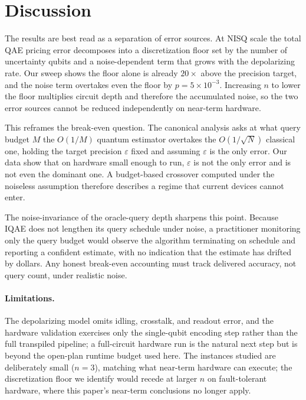 \documentclass[runningheads]{llncs}
\begin{document}
\section{Discussion}
The results are best read as a separation of error sources. At NISQ scale the
total QAE pricing error decomposes into a discretization floor set by the number
of uncertainty qubits and a noise-dependent term that grows with the depolarizing
rate. Our sweep shows the floor alone is already $20\times$ above the precision
target, and the noise term overtakes even the floor by $p = 5\times10^{-3}$.
Increasing $n$ to lower the floor multiplies circuit depth and therefore the
accumulated noise, so the two error sources cannot be reduced independently on
near-term hardware.

This reframes the break-even question. The canonical analysis asks at what query
budget $M$ the $O(1/M)$ quantum estimator overtakes the $O(1/\sqrt{N})$ classical
one, holding the target precision $\varepsilon$ fixed and assuming $\varepsilon$
is the only error. Our data show that on hardware small enough to run,
$\varepsilon$ is not the only error and is not even the dominant one. A
budget-based crossover computed under the noiseless assumption therefore
describes a regime that current devices cannot enter.

The noise-invariance of the oracle-query depth sharpens this point. Because IQAE
does not lengthen its query schedule under noise, a practitioner monitoring only
the query budget would observe the algorithm terminating on schedule and
reporting a confident estimate, with no indication that the estimate has drifted
by dollars. Any honest break-even accounting must track delivered accuracy, not
query count, under realistic noise.

\paragraph{Limitations.}
The depolarizing model omits idling, crosstalk, and readout error, and the
hardware validation exercises only the single-qubit encoding step rather than the
full transpiled pipeline; a full-circuit hardware run is the natural next step but
is beyond the open-plan runtime budget used here. The instances studied are
deliberately small ($n = 3$), matching what near-term hardware can execute; the
discretization floor we identify would recede at larger $n$ on fault-tolerant
hardware, where this paper's near-term conclusions no longer apply.
\end{document}

